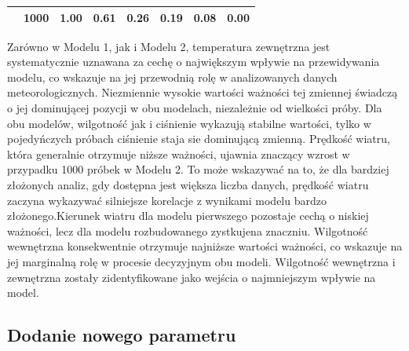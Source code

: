 \documentclass[a4paper,twoside,12pt]{book}
\begin{document}
\begin{table}[!h]
{\begin{tabular}{|c|c|c|c|c|c|c|c|}
                                                                         & 1000                                                   & 1.00                                                              & 0.61                                                             & 0.26                                                              & 0.19                                                      & 0.08                                                      & 0.00                                                            \\ \hline
    \end{tabular}
  }
\end{table}

Zarówno w Modelu 1, jak i Modelu 2, temperatura zewnętrzna jest systematycznie uznawana za cechę o największym wpływie na przewidywania modelu, co wskazuje na jej przewodnią rolę w analizowanych danych meteorologicznych. Niezmiennie wysokie wartości ważności tej zmiennej świadczą o jej dominującej pozycji w obu modelach, niezależnie od wielkości próby. Dla obu modelów, wilgotność jak i ciśnienie wykazują stabilne wartości, tylko w pojedyńczych próbach ciśnienie staja sie dominującą zmienną.
Prędkość wiatru, która generalnie otrzymuje niższe ważności, ujawnia znaczący wzrost w przypadku 1000 próbek w Modelu 2. To może wskazywać na to, że dla bardziej złożonych analiz, gdy dostępna jest większa liczba danych, prędkość wiatru zaczyna wykazywać silniejsze korelacje z wynikami modelu bardzo złożonego.Kierunek wiatru dla modelu pierwszego pozostaje cechą o niskiej ważności, lecz dla modelu rozbudowanego zystkujena znaczniu. Wilgotność wewnętrzna konsekwentnie otrzymuje najniższe wartości ważności, co wskazuje na jej marginalną rolę w procesie decyzyjnym obu modeli. Wilgotność wewnętrzna i zewnętrzna zostały zidentyfikowane jako wejścia o najmniejszym wpływie na model.

\newpage
\subsection{Dodanie nowego parametru}
\end{document}
